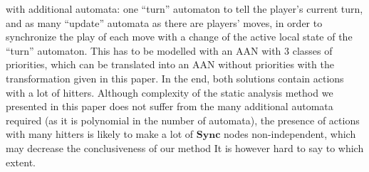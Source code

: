 \documentclass[11pt]{article}
\begin{document}
{\begin{itemize}
    with additional automata: one “turn” automaton to tell the player's current turn,
    and as many “update” automata as there are players' moves,
    in order to synchronize the play of each move with a change of the active local state of the “turn” automaton.
    This has to be modelled with an AAN with 3 classes of priorities,
    which can be translated into an AAN without priorities with the transformation given in this paper.
    In the end, both solutions contain actions with a lot of hitters.
    Although complexity of the static analysis method we presented in this paper does not suffer from the many additional automata required (as it is polynomial in the number of automata),
    the presence of actions with many hitters is likely to make a lot of $\mathbf{Sync}$ nodes non-independent,
    which may decrease the conclusiveness of our method
    It is however hard to say to which extent.
%     

\end{itemize}}
\end{document}
